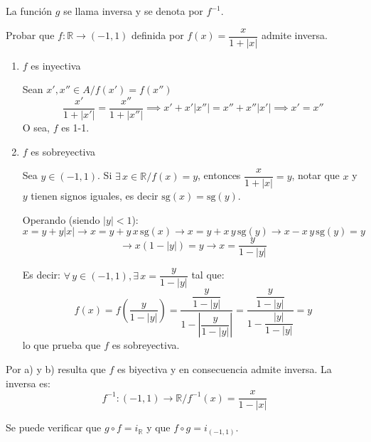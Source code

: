 La función $g$ se llama inversa y se denota por $f^{-1}$.

\begin{fmd-example}
	Probar que $f: \mathbb{R} \rightarrow (-1, 1)$ definida por 
	$f(x) = \dfrac{x}{1 + |x|}$ admite inversa.
	
	\begin{enumerate}[label=\textbf{\alph*)}]
		\item $f$ es inyectiva
		
		Sean $x', x'' \in A / f(x') = f(x'')$
		\[ \frac{x'}{1 + |x'|} = \frac{x''}{1 + |x''|} \implies x' + x'|x''| = 
		x'' + x'' |x'| \implies x' = x'' \]
		O sea, $f$ es 1-1.
		\item $f$ es sobreyectiva
		
		Sea $y \in (-1, 1)$. Si $\exists \, x \in \mathbb{R} / f(x) = y$, entonces 
		$\dfrac{x}{1 + |x|} = y$, notar que $x$ y $y$ tienen signos iguales, es decir 
		$\mathrm{sg}(x) = \mathrm{sg}(y)$.
		
		Operando (siendo $|y| < 1$):
		\[ x = y + y|x| \rightarrow x = y + y \, x \, \mathrm{sg}(x) \rightarrow
		x = y + x \, y \, \mathrm{sg}(y) \rightarrow x - x \, y \, \mathrm{sg}(y) = y \]
		\[ \rightarrow x(1 - |y|) = y \rightarrow x = \frac{y}{1 - |y|}\]
	
		Es decir: $\forall \, y \in (-1, 1), \exists \, x = \dfrac{y}{1 - |y|}$ tal que:
		\[ f(x) = f \left( \frac{y}{1 - |y|} \right) = \frac{\dfrac{y}{1-|y|}}{1 - 
			\left| \dfrac{y}{1 - |y|} \right|} = \frac{\dfrac{y}{1 - |y|}}{1 - \dfrac{|y|}
			{1 - |y|}} = y \]
		lo que prueba que $f$ es sobreyectiva.
\end{enumerate}
	
	Por a) y b) resulta que $f$ es biyectiva y en consecuencia admite inversa. La 
	inversa es: \[ f^{-1}: (-1,1) \rightarrow \mathbb{R} / f^{-1}(x) = \dfrac{x}{1 - |x|}\]
	
	Se puede verificar que $g \circ f = i_\mathbb{R}$ y que $f \circ g = i_{(-1,1)}$.
\end{fmd-example}

